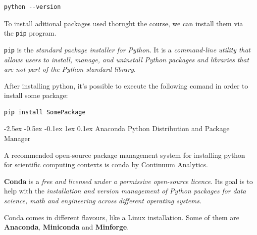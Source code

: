 \documentclass[12pt]{report}
\makeatletter
\renewcommand{\section}{\@startsection{section}{1}{\z@}%
  {-2.5ex \@plus -0.5ex \@minus -0.1ex}%
  {1ex \@plus 0.1ex}%
  {\normalfont\Large\sectionstyle}}
\newcommand{\sectionstyle}[1]{%
  \par\noindent\hrule
  \vspace{0.2ex}%
  {\scshape{#1}\par}%
  \vspace{0.4ex}%
  \hrule
}
\theoremstyle{largebreak}
\makeatother
\begin{document}
    \begin{lstlisting}[caption={Check Python Version},label=code:chec_python_version, language = python]
python --version
    \end{lstlisting}

    \begin{obs}
        To install aditional packages used thorught the course, we can install them via the \lstinline|pip| program.
    \end{obs}

    \begin{mydef}
        \lstinline|pip| is the \textit{standard package installer for Python}. It is a \textit{command-line utility that allows users to install, manage, and uninstall Python packages and libraries that are not part of the Python standard library}.
    \end{mydef}

    After installing python, it's possible to execute the following comand in order to install some package:

    \begin{lstlisting}[caption={\lstinline|pip| Package Installation.},label=code:python_package_installation]
        pip install SomePackage
    \end{lstlisting}

    \section{Anaconda Python Distribution and Package Manager}

    \begin{idea}
        A recommended open-source package management system for installing python for scientific computing contexts is conda by Continuum Analytics.
    \end{idea}

    \begin{mydef}
        \textbf{Conda} is a \textit{free and licensed under a permissive open-source licence}. Its goal is to help with the \textit{installation and version management of Python packages for data science, math and engineering across different operating systems}.
    \end{mydef}

    Conda comes in different flavours, like a Linux installation. Some of them are \textbf{Anaconda}, \textbf{Miniconda} and \textbf{Minforge}.
\end{document}
